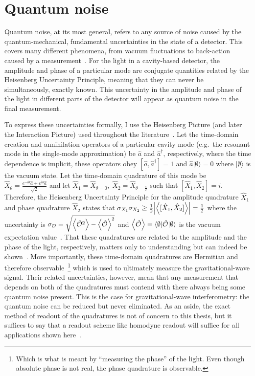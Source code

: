 \section{Quantum noise}
\label{sec:qnoise}

Quantum noise, at its most general, refers to any source of noise caused by the quantum-mechanical, fundamental uncertainties in the state of a detector. This covers many different phenomena, from vacuum fluctuations to back-action caused by a measurement~\cite{}. For the light in a cavity-based detector, the amplitude and phase of a particular mode are conjugate quantities related by the Heisenberg Uncertainty Principle, meaning that they can never be simultaneously, exactly known. This uncertainty in the amplitude and phase of the light in different parts of the detector will appear as quantum noise in the final measurement. %

To express these uncertainties formally, I use the Heisenberg Picture (and later the Interaction Picture) used throughout the literature~\cite{Danilishin,}. Let the time-domain creation and annihilation operators of a particular cavity mode (e.g.\ the resonant mode in the single-mode approximation) be $\hat{a}$ and $\hat{a}^\dag$, respectively, where the time dependence is implicit, these operators obey $[\hat{a},\hat{a}^\dag]=1$ and $\hat{a}\lvert\emptyset\rangle=0$ where $\lvert\emptyset\rangle$ is the vacuum state. Let the time-domain quadrature of this mode be $\hat{X}_\theta=\frac{e^{-i \theta}\hat{a}+e^{i \theta}\hat{a}}{\sqrt{2}}$ and let $\hat{X}_1=\hat{X}_{\theta=0},\; \hat{X}_2=\hat{X}_{\theta=\frac{\pi}{2}}$ such that $[\hat{X}_1,\hat{X}_2]=i$. Therefore, the Heisenberg Uncertainty Principle for the amplitude quadrature $\hat{X}_1$ and phase quadrature $\hat{X}_2$ states that $\sigma_{X_1}\sigma_{X_2}\geq\frac{1}{2}\abs{\ev{[\hat{X}_1,\hat{X}_2]}}=\frac{1}{2}$ where the uncertainty is $\sigma_\mathcal{O}=\sqrt{\ev{\hat{\mathcal{O}}^2}-\ev{\hat{\mathcal{O}}}^2}$ and $\ev{\hat{\mathcal{O}}}=\langle\emptyset\lvert\hat{\mathcal{O}}\rvert\emptyset\rangle$ is the vacuum expectation value~\cite{}. That these quadratures are related to the amplitude and the phase of the light, respectively, matters only to understanding but can indeed be shown~\cite{Danilishin}. More importantly, these time-domain quadratures are Hermitian and therefore observable~\footnote{Which is what is meant by ``measuring the phase'' of the light. Even though absolute phase is not real, the phase quadrature is observable.} which is used to ultimately measure the gravitational-wave signal. Their related uncertainties, however, mean that any measurement that depends on both of the quadratures must contend with there always being some quantum noise present. This is the case for gravitational-wave interferometry: the quantum noise can be reduced but never eliminated. 
As an aside, the exact method of readout of the quadratures is not of concern to this thesis, but it suffices to say that a readout scheme like homodyne readout will suffice for all applications shown here~\cite{}.


